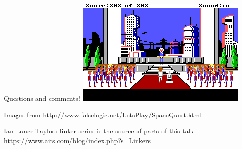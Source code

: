 \documentclass{beamer}
\begin{document}
\begin{frame}{Questions and comments!}
  \includegraphics[width=\linewidth]{sq_final}

  \footnotesize
  Images from \url{http://www.falselogic.net/LetsPlay/SpaceQuest.html}

  Ian Lance Taylors linker series is the source of parts of this talk
  \url{https://www.airs.com/blog/index.php?s=Linkers}
\end{frame}
\end{document}
